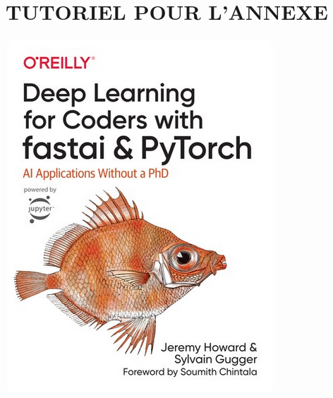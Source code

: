 \documentclass[12pt]{article} 	%
\begin{document}
\newpage
\appendix

\section{TUTORIEL POUR L'ANNEXE}\label{appendix:fastbook}

\begin{center}
    \includegraphics[scale=1.3]{img/fastbook.png}
\end{center}


\newpage


\end{document}
